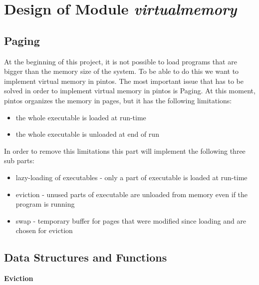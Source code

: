 
\chapter{Design of Module \textit{virtualmemory}}


\section{Paging}

At the beginning of this project, it is not possible to load programs that are bigger than the memory size of the system. To be able to do this we want to implement virtual memory in pintos. The most important issue that has to be solved in order to implement virtual memory in pintos is Paging. At this moment, pintos organizes the memory in pages, but it has the following limitations:
\begin{itemize}
 \item the whole executable is loaded at run-time 
 \item the whole executable is unloaded at end of run
\end{itemize}

In order to remove this limitations this part will implement the following three sub parts:
\begin{itemize}
  \item lazy-loading of executables - only a part of executable is loaded at run-time
  \item	eviction - unused parts of executable are unloaded from memory even if the program is running
  \item swap - temporary buffer for pages that were modified since loading and are chosen for eviction
\end{itemize}

\section{Data Structures and Functions}

\textbf{Eviction}

